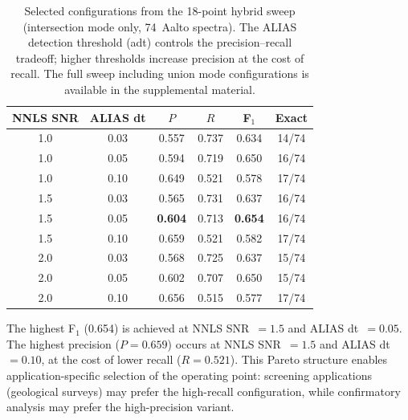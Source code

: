 \begin{table}[t]
  \centering
  \caption{Selected configurations from the 18-point hybrid sweep (intersection mode only, 74~Aalto spectra). The ALIAS detection threshold (adt) controls the precision--recall tradeoff; higher thresholds increase precision at the cost of recall. The full sweep including union mode configurations is available in the supplemental material.}
  \label{tab:hybrid-sweep}
  \begin{tabular}{cccccc}
    \toprule
    NNLS SNR & ALIAS dt & $P$ & $R$ & F$_1$ & Exact \\
    \midrule
    1.0 & 0.03 & 0.557 & 0.737 & 0.634 & 14/74 \\
    1.0 & 0.05 & 0.594 & 0.719 & 0.650 & 16/74 \\
    1.0 & 0.10 & 0.649 & 0.521 & 0.578 & 17/74 \\
    1.5 & 0.03 & 0.565 & 0.731 & 0.637 & 16/74 \\
    1.5 & 0.05 & \textbf{0.604} & 0.713 & \textbf{0.654} & 16/74 \\
    1.5 & 0.10 & 0.659 & 0.521 & 0.582 & 17/74 \\
    2.0 & 0.03 & 0.568 & 0.725 & 0.637 & 15/74 \\
    2.0 & 0.05 & 0.602 & 0.707 & 0.650 & 15/74 \\
    2.0 & 0.10 & 0.656 & 0.515 & 0.577 & 17/74 \\
    \bottomrule
  \end{tabular}
\end{table}

The highest F$_1$ (0.654) is achieved at NNLS SNR~$= 1.5$ and ALIAS dt~$= 0.05$.
The highest precision ($P = 0.659$) occurs at NNLS SNR~$= 1.5$ and ALIAS dt~$= 0.10$, at the cost of lower recall ($R = 0.521$).
This Pareto structure enables application-specific selection of the operating point: screening applications (geological surveys) may prefer the high-recall configuration, while confirmatory analysis may prefer the high-precision variant.
